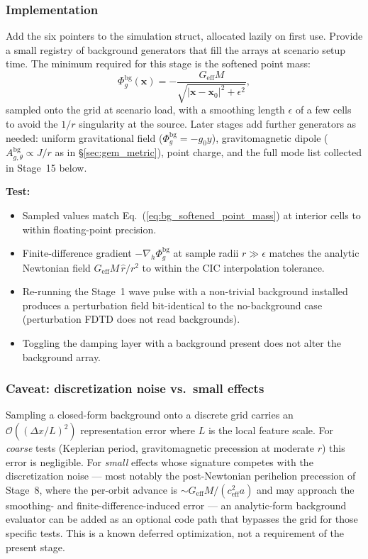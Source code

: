 \documentclass[11pt,a4paper]{article}
\newcommand{\vv}[1]{\mathbf{#1}}
\newcommand{\Phig}{\Phi_g}
\newcommand{\order}[1]{\mathcal{O}(#1)}
\begin{document}
\subsubsection*{Implementation}

Add the six pointers to the simulation struct, allocated lazily on first use.  Provide a small registry of background generators that fill the arrays at scenario setup time.  The minimum required for this stage is the softened point mass:
\begin{equation}
\label{eq:bg_softened_point_mass}
  \Phig^{\mathrm{bg}}(\vv{x}) = -\frac{G_{\mathrm{eff}}M}{\sqrt{|\vv{x}-\vv{x}_0|^2 + \epsilon^2}},
\end{equation}
sampled onto the grid at scenario load, with a smoothing length $\epsilon$ of a few cells to avoid the $1/r$ singularity at the source.  Later stages add further generators as needed: uniform gravitational field ($\Phig^{\mathrm{bg}}=-g_0 y$), gravitomagnetic dipole ($A_{g,\theta}^{\mathrm{bg}}\propto J/r$ as in §\ref{sec:gem_metric}), point charge, and the full mode list collected in Stage~15 below.

\textbf{Test:}
\begin{itemize}
  \item Sampled values match Eq.~(\ref{eq:bg_softened_point_mass}) at interior cells to within floating-point precision.
  \item Finite-difference gradient $-\nabla_h\Phig^{\mathrm{bg}}$ at sample radii $r\gg\epsilon$ matches the analytic Newtonian field $G_{\mathrm{eff}}M\,\hat r/r^2$ to within the CIC interpolation tolerance.
  \item Re-running the Stage~1 wave pulse with a non-trivial background installed produces a perturbation field bit-identical to the no-background case (perturbation FDTD does not read backgrounds).
  \item Toggling the damping layer with a background present does not alter the background array.
\end{itemize}

\subsubsection*{Caveat: discretization noise vs.\ small effects}

Sampling a closed-form background onto a discrete grid carries an $\order{(\Delta x/L)^2}$ representation error where $L$ is the local feature scale.  For \emph{coarse} tests (Keplerian period, gravitomagnetic precession at moderate $r$) this error is negligible.  For \emph{small} effects whose signature competes with the discretization noise --- most notably the post-Newtonian perihelion precession of Stage~8, where the per-orbit advance is $\sim G_{\mathrm{eff}}M/(c_{\mathrm{eff}}^2 a)$ and may approach the smoothing- and finite-difference-induced error --- an analytic-form background evaluator can be added as an optional code path that bypasses the grid for those specific tests.  This is a known deferred optimization, not a requirement of the present stage.
\end{document}
